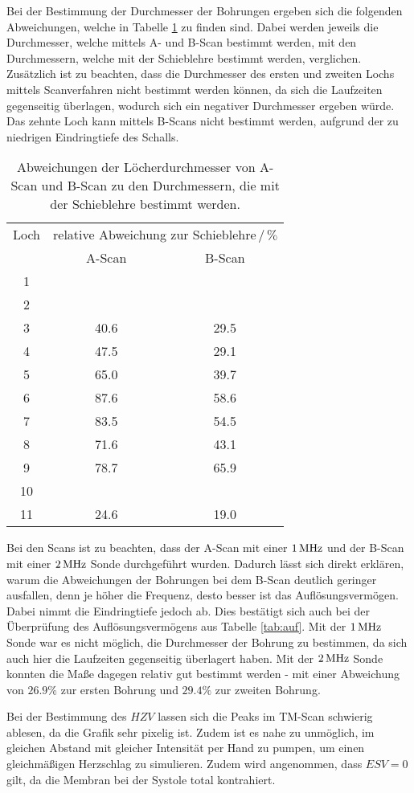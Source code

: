 Bei der Bestimmung der Durchmesser der Bohrungen ergeben sich die folgenden
Abweichungen, welche in Tabelle \ref{tab:abweichung} zu finden sind.
Dabei werden jeweils die Durchmesser, welche mittels A- und B-Scan bestimmt werden, mit den Durchmessern, welche mit der Schieblehre bestimmt werden, verglichen. Zusätzlich ist zu beachten, dass die Durchmesser des ersten und zweiten Lochs mittels Scanverfahren nicht bestimmt werden können, da sich die Laufzeiten gegenseitig überlagen, wodurch sich ein negativer Durchmesser ergeben würde. Das zehnte Loch kann mittels B-Scans nicht bestimmt werden, aufgrund der zu niedrigen Eindringtiefe des Schalls.
\begin{table}
  \centering
  \begin{tabular}{c|cc}
    \toprule
    \multicolumn{1}{c|}{Loch} & \multicolumn{2}{c}{relative Abweichung zur Schieblehre$\,/\,\%$}\\
    & {A-Scan} & {B-Scan} \\
  \midrule
  1  &  \hrulefill  & \hrulefill  \\
  2  &  \hrulefill  & \hrulefill  \\
  3  &  40.6        & 29.5  \\
  4  &  47.5        & 29.1  \\
  5  &  65.0        & 39.7  \\
  6  &  87.6        & 58.6  \\
  7  &  83.5        & 54.5  \\
  8  &  71.6        & 43.1  \\
  9  &  78.7        & 65.9  \\
  10 &  \hrulefill  & \hrulefill  \\
  11 &  24.6        & 19.0  \\
  \bottomrule
  \end{tabular}
  \caption{Abweichungen der Löcherdurchmesser von A-Scan und B-Scan zu den Durchmessern, die mit der Schieblehre bestimmt werden.}
  \label{tab:abweichung}
\end{table}
Bei den Scans ist zu beachten, dass der A-Scan mit einer $1\,\si{\mega\hertz}$ und der B-Scan
mit einer $2\,\si{\mega\hertz}$ Sonde durchgeführt wurden. Dadurch lässt sich direkt erklären, warum die Abweichungen der Bohrungen bei dem B-Scan deutlich geringer ausfallen, denn je höher die Frequenz, desto besser ist das Auflösungsvermögen. Dabei nimmt die Eindringtiefe jedoch ab. Dies bestätigt sich auch bei der Überprüfung des Auflösungsvermögens aus Tabelle \ref{tab:auf}. Mit der $1\,\si{\mega\hertz}$ Sonde war es nicht möglich, die Durchmesser der Bohrung zu bestimmen, da sich auch hier die Laufzeiten gegenseitig überlagert haben. Mit der $2\,\si{\mega\hertz}$ Sonde konnten die Maße dagegen relativ gut bestimmt werden - mit einer Abweichung von $26.9\%$ zur ersten Bohrung und $29.4\%$ zur zweiten Bohrung.

Bei der Bestimmung des $HZV$ lassen sich die Peaks im TM-Scan schwierig ablesen, da die Grafik sehr pixelig ist. Zudem ist es nahe zu unmöglich, im gleichen Abstand mit gleicher Intensität per Hand zu pumpen, um einen gleichmäßigen Herzschlag zu simulieren. Zudem wird angenommen, dass $ESV = 0$ gilt, da die Membran bei der Systole total kontrahiert.
